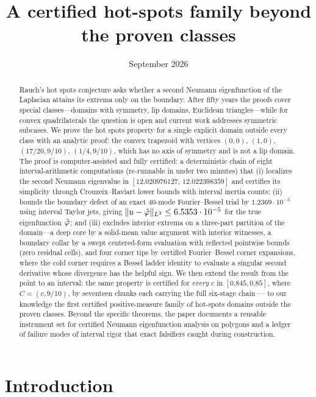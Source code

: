 \documentclass[11pt]{article}
\title{A certified hot-spots family beyond the proven classes}
\author{\cmauthor}
\date{September 2026}
\begin{document}
\maketitle

\begin{abstract}
Rauch's hot spots conjecture asks whether a second Neumann eigenfunction
of the Laplacian attains its extrema only on the boundary. After fifty
years the proofs cover special classes---domains with symmetry, lip
domains, Euclidean triangles---while for convex quadrilaterals the
question is open and current work addresses symmetric subcases. We prove
the hot spots property for a single explicit domain outside every class
with an analytic proof: the convex trapezoid with vertices $(0,0)$,
$(1,0)$, $(17/20,9/10)$, $(1/4,9/10)$, which has no axis of symmetry and
is not a lip domain. The proof is computer-assisted and fully certified:
a deterministic chain of eight interval-arithmetic computations
(re-runnable in under two minutes) that (i) localizes the second
Neumann eigenvalue in $[12.020976127,\,12.022398359]$ and certifies its
simplicity through Crouzeix--Raviart lower bounds with interval inertia
counts; (ii) bounds the boundary defect of an exact 40-mode
Fourier--Bessel trial by $1.2369\cdot10^{-5}$ using interval Taylor jets,
giving $\lVert u-\hat\varphi \rVert_{L^2}\le 6.5353\cdot10^{-5}$ for the true
eigenfunction $\hat\varphi$; and (iii) excludes interior extrema on a
three-part partition of the domain---a deep core by a solid-mean value
argument with interior witnesses, a boundary collar by a swept
centered-form evaluation with reflected pointwise bounds (zero residual
cells), and four corner tips by certified Fourier--Bessel corner
expansions, where the cold corner requires a Bessel ladder identity to
evaluate a singular second derivative whose divergence has the helpful
sign. We then extend the result from the point to an
interval: the same property is certified for \emph{every} $c$ in
$[0.845,0.85]$, where $C=(c,9/10)$, by seventeen chunks each carrying
the full six-stage chain --- to our knowledge the first certified
positive-measure family of hot-spots domains outside the proven classes.
Beyond the specific theorems, the paper documents a reusable
instrument set for certified Neumann eigenfunction analysis on polygons
and a ledger of failure modes of interval rigor that exact
falsifiers caught during construction.
\end{abstract}

\section{Introduction}
\end{document}
